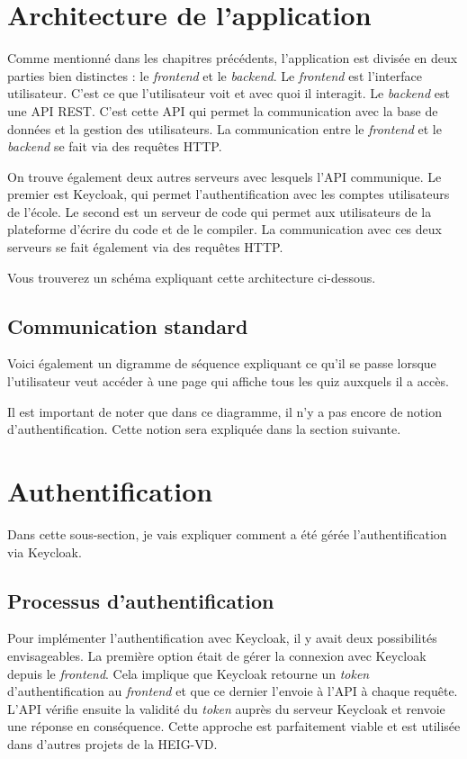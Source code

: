 \section{Architecture de l'application}
Comme mentionné dans les chapitres précédents, l'application est divisée en deux parties bien distinctes : le \emph{frontend} et le \emph{backend}. Le \emph{frontend} est l'interface utilisateur. C'est ce que l'utilisateur voit et avec quoi il interagit. Le \emph{backend} est une API REST. C'est cette API qui permet la communication avec la base de données et la gestion des utilisateurs. La communication entre le \emph{frontend} et le \emph{backend} se fait via des requêtes HTTP.

On trouve également deux autres serveurs avec lesquels l'API communique. Le premier est Keycloak, qui permet l'authentification avec les comptes utilisateurs de l'école. Le second est un serveur de code qui permet aux utilisateurs de la plateforme d'écrire du code et de le compiler. La communication avec ces deux serveurs se fait également via des requêtes HTTP.

Vous trouverez un schéma expliquant cette architecture ci-dessous.


\subsection{Communication standard}

Voici également un digramme de séquence expliquant ce qu'il se passe lorsque l'utilisateur veut accéder à une page qui affiche tous les quiz auxquels il a accès.


Il est important de noter que dans ce diagramme, il n'y a pas encore de notion d'authentification. Cette notion sera expliquée dans la section suivante.

\section{Authentification}
Dans cette sous-section, je vais expliquer comment a été gérée l'authentification via Keycloak.

\subsection{Processus d'authentification}
Pour implémenter l'authentification avec Keycloak, il y avait deux possibilités envisageables. La première option était de gérer la connexion avec Keycloak depuis le \emph{frontend}. Cela implique que Keycloak retourne un \emph{token} d'authentification au \emph{frontend} et que ce dernier l'envoie à l'API à chaque requête. L'API vérifie ensuite la validité du \emph{token} auprès du serveur Keycloak et renvoie une réponse en conséquence. Cette approche est parfaitement viable et est utilisée dans d'autres projets de la HEIG-VD.

